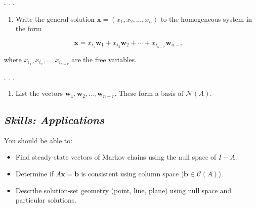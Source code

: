 \documentclass[
  letterpaper,
  DIV=11,
  numbers=noendperiod]{scrartcl}
\providecommand{\tightlist}{%
  \setlength{\itemsep}{0pt}\setlength{\parskip}{0pt}}\usepackage{longtable,booktabs,array}
\begin{document}
. . .

\begin{enumerate}
\def\labelenumi{\arabic{enumi}.}
\setcounter{enumi}{2}
\tightlist
\item
  Write the general solution
  \(\mathbf{x}=\left(x_{1}, x_{2}, \ldots, x_{n}\right)\) to the
  homogeneous system in the form
\end{enumerate}

\[
\mathbf{x}=x_{i_{1}} \mathbf{w}_{1}+x_{i_{2}} \mathbf{w}_{2}+\cdots+x_{i_{n-r}} \mathbf{w}_{n-r}
\]

where \(x_{i_{1}}, x_{i_{2}}, \ldots, x_{i_{n-r}}\) are the free
variables.

. . .

\begin{enumerate}
\def\labelenumi{\arabic{enumi}.}
\setcounter{enumi}{3}
\tightlist
\item
  List the vectors
  \(\mathbf{w}_{1}, \mathbf{w}_{2}, \ldots, \mathbf{w}_{n-r}\). These
  form a basis of \(\mathcal{N}(A)\).
\end{enumerate}

\subsection{\texorpdfstring{\emph{Skills:
Applications}}{Skills: Applications}}\label{skills-applications}

You should be able to:

\begin{itemize}
\tightlist
\item
  Find steady-state vectors of Markov chains using the null space of
  \(I-A\).
\item
  Determine if \(A\mathbf{x}=\mathbf{b}\) is consistent using column
  space (\(\mathbf{b}\in\mathcal{C}(A)\)).
\item
  Describe solution-set geometry (point, line, plane) using null space
  and particular solutions.
\end{itemize}
\end{document}
